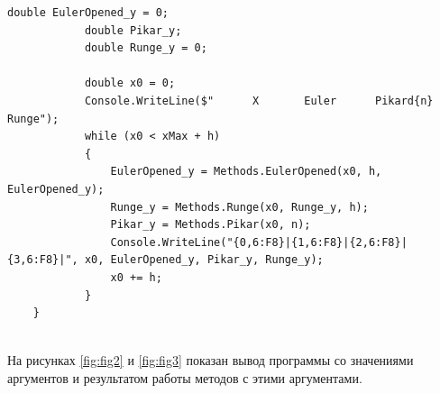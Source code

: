 \begin{lstlisting}[caption=код программы, label=lst3]
            double EulerOpened_y = 0;
            double Pikar_y;
            double Runge_y = 0;

            double x0 = 0;
            Console.WriteLine($"      X       Euler      Pikard{n}    Runge");
            while (x0 < xMax + h)
            {
                EulerOpened_y = Methods.EulerOpened(x0, h, EulerOpened_y);
                Runge_y = Methods.Runge(x0, Runge_y, h);
                Pikar_y = Methods.Pikar(x0, n);
                Console.WriteLine("{0,6:F8}|{1,6:F8}|{2,6:F8}|{3,6:F8}|", x0, EulerOpened_y, Pikar_y, Runge_y);
                x0 += h;
            }
    }
   
\end{lstlisting}

На рисунках \ref{fig:fig2} и \ref{fig:fig3} показан вывод программы со значениями аргументов и результатом работы методов с этими аргументами.

